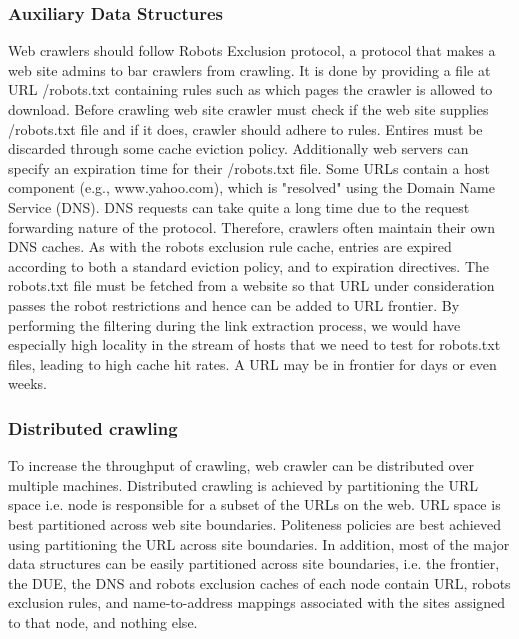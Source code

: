 \documentclass[article,type=msc,colorback,accentcolor=tud9c,twoside,11pt]{tudthesis}
\begin{document}
\subsubsection{Auxiliary Data Structures}
Web crawlers should follow Robots Exclusion protocol, a protocol that makes a web site admins to bar crawlers from crawling. It is done by providing a file at URL /robots.txt containing rules such as which pages the crawler is allowed to download. Before crawling web site crawler must check if the web site supplies /robots.txt file and if it does, crawler should adhere to rules. Entires must be discarded through some cache eviction policy. Additionally web servers can specify an expiration time for their /robots.txt file. Some URLs contain a host component (e.g., www.yahoo.com), which is "resolved" using the Domain Name Service (DNS). DNS requests can take quite a long time due to the request forwarding nature of the protocol. Therefore, crawlers often maintain their own DNS caches. As with the robots exclusion rule cache, entries are expired according to both a standard eviction policy, and to expiration directives. The robots.txt file must be fetched from a website so that URL under consideration passes the robot restrictions and hence can be added to URL frontier. By performing the filtering during the link extraction process, we would have especially high locality in the stream of hosts that we need to test for robots.txt files, leading to high cache hit rates. A URL may be in frontier for days or even weeks.
 
\subsubsection{Distributed crawling}

To increase the throughput of crawling, web crawler can be distributed over multiple machines. Distributed crawling is achieved by partitioning the URL space i.e. node is responsible for a subset of the URLs on the web. URL space is best partitioned across web site boundaries. Politeness policies are best achieved using partitioning the URL across site boundaries. In addition, most of the major data structures can be easily partitioned across site boundaries, i.e. the frontier, the DUE, the DNS and robots exclusion caches of each node contain URL, robots exclusion rules, and name-to-address mappings associated with the sites assigned to that node, and nothing else.
\end{document}
